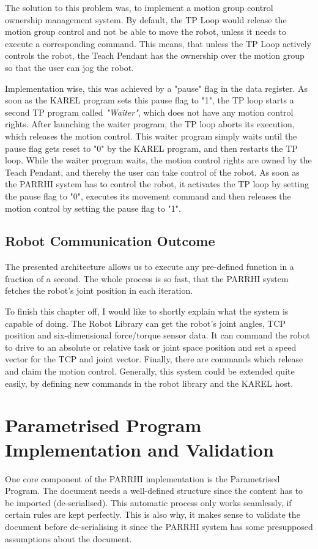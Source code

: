 The solution to this problem was, to implement a motion group control ownership management system. By default, the TP Loop would release the motion group control and not be able to move the robot, unless it needs to execute a corresponding command. This means, that unless the TP Loop actively controls the robot, the Teach Pendant has the ownership over the motion group so that the user can jog the robot.

Implementation wise, this was achieved by a "pause" flag in the data register. As soon as the KAREL program sets this pause flag to "1", the TP loop starts a second TP program called \textit{"Waiter"}, which does not have any motion control rights. After launching the waiter program, the TP loop aborts its execution, which releases the motion control. This waiter program simply waits until the pause flag gets reset to "0" by the KAREL program, and then restarts the TP loop. While the waiter program waits, the motion control rights are owned by the Teach Pendant, and thereby the user can take control of the robot. As soon as the PARRHI system has to control the robot, it activates the TP loop by setting the pause flag to "0", executes its movement command and then releases the motion control by setting the pause flag to "1".

\subsection{Robot Communication Outcome}

The presented architecture allows us to execute any pre-defined function in a fraction of a second. The whole process is so fast, that the PARRHI system fetches the robot's joint position in each iteration.

To finish this chapter off, I would like to shortly explain what the system is capable of doing. The Robot Library can get the robot's joint angles, TCP position and six-dimensional force/torque sensor data. It can command the robot to drive to an absolute or relative task or joint space position and set a speed vector for the TCP and joint vector. Finally, there are commands which release and claim the motion control. Generally, this system could be extended quite easily, by defining new commands in the robot library and the KAREL host.

\section{Parametrised Program Implementation and Validation}
One core component of the PARRHI implementation is the Parametrised Program. The document needs a well-defined structure since the content has to be imported (de-serialised). This automatic process only works seamlessly, if certain rules are kept perfectly. This is also why, it makes sense to validate the document before de-serialising it since the PARRHI system has some presupposed assumptions about the document.  

